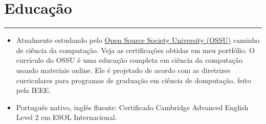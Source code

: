 \documentclass[a4paper,10pt]{article}
\newcommand{\ulink}[2]{\href{#1}{\underline{#2}}}
\begin{document}
\section*{Educação}
\hrule
\vspace{2mm}
\begin{itemize}[itemsep=0pt]
  \item Atualmente estudando pelo
        \ulink{https://github.com/ossu/computer-science}{Open Source Society University (OSSU)}
        caminho de ciência da computação. Veja as certificações obtidas em meu portfólio. O currículo do OSSU
        é uma educação completa em ciência da computação usando materiais online. Ele é projetado
        de acordo com as diretrizes curriculares para programas de graduação em ciência de domputação, feito pela IEEE.
  \item Português nativo, inglês fluente: Certificado Cambridge Advanced English Level 2 em ESOL Internacional.
\end{itemize}
\end{document}
